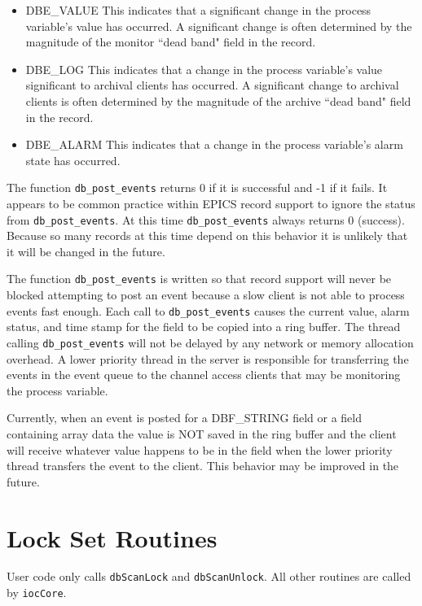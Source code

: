 \begin{itemize}
\item DBE\_VALUE This indicates that a significant change in the process variable's value has occurred.
A significant change is often determined by the magnitude of the monitor ``dead band" field in the record.

\item DBE\_LOG This indicates that a change in the process variable's value significant to archival clients has occurred.
A significant change to archival clients is often determined by the magnitude of the archive ``dead band" field in the record.

\item DBE\_ALARM This indicates that a change in the process variable's alarm state has occurred.

\end{itemize}

The function \verb|db_post_events| returns 0 if it is successful and -1 if it fails.
It appears to be common practice within EPICS record support to ignore the status from \verb|db_post_events|.
At this time \verb|db_post_events| always returns 0 (success).
Because so many records at this time depend on this behavior it is unlikely that it will be changed in the future.

The function \verb|db_post_events| is written so that record support will never be blocked attempting to post an event because a slow client is not able to process events fast enough.
Each call to \verb|db_post_events| causes the current value, alarm status, and time stamp for the field to be copied into a ring buffer.
The thread calling \verb|db_post_events| will not be delayed by any network or memory allocation overhead.
A lower priority thread in the server is responsible for transferring the events in the event queue to the channel access clients that may be monitoring the process variable.

Currently, when an event is posted for a DBF\_STRING field or a field containing array data the value is NOT saved in the ring buffer and the client will receive whatever value happens to be in the field when the lower priority thread transfers 
the event to the client.
This behavior may be improved in the future.

\section{Lock Set Routines}

User code only calls \verb|dbScanLock| and \verb|dbScanUnlock|.
All other routines are called by \verb|iocCore|.


